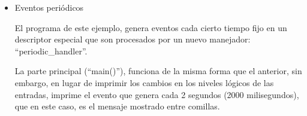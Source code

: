 \begin{itemize}
\clearpage

    \item Eventos periódicos
    
    El programa de este ejemplo, genera eventos cada cierto tiempo fijo en un descriptor especial que son procesados por un nuevo manejador: ``periodic\_handler''. 
    

    
    La parte principal (``main()''), funciona de la misma forma que el anterior, sin embargo, en lugar de imprimir los cambios en los niveles lógicos de las entradas, imprime el evento que genera cada 2 segundos (2000 milisegundos), que en este caso, es el mensaje mostrado entre comillas.


\end{itemize}

